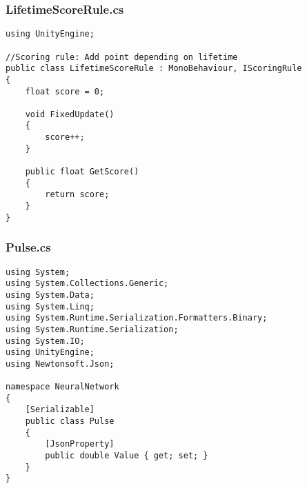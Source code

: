 \documentclass[12pt,a4paper]{article}
\begin{document}
\subsubsection*{LifetimeScoreRule.cs}
\begin{lstlisting}
using UnityEngine;

//Scoring rule: Add point depending on lifetime
public class LifetimeScoreRule : MonoBehaviour, IScoringRule
{
    float score = 0;

    void FixedUpdate()
    {
        score++;
    }

    public float GetScore()
    {
        return score;
    }
}\end{lstlisting}
\pagebreak


\subsubsection*{Pulse.cs}
\begin{lstlisting}
using System;
using System.Collections.Generic;
using System.Data;
using System.Linq;
using System.Runtime.Serialization.Formatters.Binary;
using System.Runtime.Serialization;
using System.IO;
using UnityEngine;
using Newtonsoft.Json;

namespace NeuralNetwork
{
    [Serializable]
    public class Pulse
    {	
        [JsonProperty]
        public double Value { get; set; }
    }
}






\end{lstlisting}
\pagebreak
\end{document}
